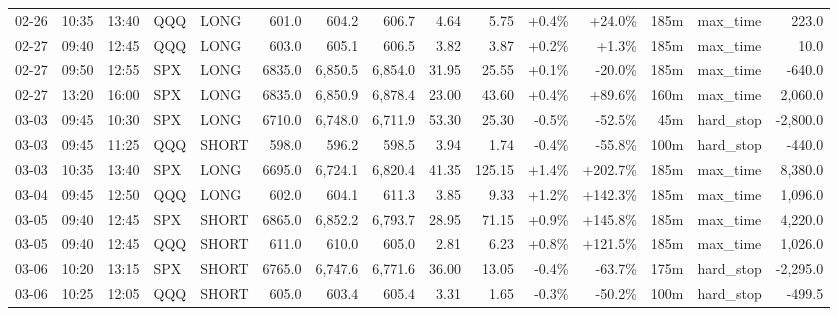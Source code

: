 \documentclass[11pt,a4paper,twoside]{article}
\begin{document}
\begin{landscape}
\begin{center}
\begin{longtable}{>{\color{txtmain}}l l l l l r r r r r r r r >{\color{txtmain}}l r}
02-26 & 10:35 & 13:40 & QQQ & LONG & 601.0 & 604.2 & 606.7 & 4.64 & 5.75 & \textcolor{wingreen}{+0.4\%} & \textcolor{wingreen}{+24.0\%} & 185m & max\_time & \textcolor{wingreen}{223.0} \\
02-27 & 09:40 & 12:45 & QQQ & LONG & 603.0 & 605.1 & 606.5 & 3.82 & 3.87 & \textcolor{wingreen}{+0.2\%} & \textcolor{wingreen}{+1.3\%} & 185m & max\_time & \textcolor{wingreen}{10.0} \\
02-27 & 09:50 & 12:55 & SPX & LONG & 6835.0 & 6,850.5 & 6,854.0 & 31.95 & 25.55 & \textcolor{wingreen}{+0.1\%} & \textcolor{lossred}{-20.0\%} & 185m & max\_time & \textcolor{lossred}{-640.0} \\
02-27 & 13:20 & 16:00 & SPX & LONG & 6835.0 & 6,850.9 & 6,878.4 & 23.00 & 43.60 & \textcolor{wingreen}{+0.4\%} & \textcolor{wingreen}{+89.6\%} & 160m & max\_time & \textcolor{wingreen}{2,060.0} \\
03-03 & 09:45 & 10:30 & SPX & LONG & 6710.0 & 6,748.0 & 6,711.9 & 53.30 & 25.30 & \textcolor{lossred}{-0.5\%} & \textcolor{lossred}{-52.5\%} & 45m & hard\_stop & \textcolor{lossred}{-2,800.0} \\
03-03 & 09:45 & 11:25 & QQQ & SHORT & 598.0 & 596.2 & 598.5 & 3.94 & 1.74 & \textcolor{lossred}{-0.4\%} & \textcolor{lossred}{-55.8\%} & 100m & hard\_stop & \textcolor{lossred}{-440.0} \\
03-03 & 10:35 & 13:40 & SPX & LONG & 6695.0 & 6,724.1 & 6,820.4 & 41.35 & 125.15 & \textcolor{wingreen}{+1.4\%} & \textcolor{wingreen}{+202.7\%} & 185m & max\_time & \textcolor{wingreen}{8,380.0} \\
03-04 & 09:45 & 12:50 & QQQ & LONG & 602.0 & 604.1 & 611.3 & 3.85 & 9.33 & \textcolor{wingreen}{+1.2\%} & \textcolor{wingreen}{+142.3\%} & 185m & max\_time & \textcolor{wingreen}{1,096.0} \\
03-05 & 09:40 & 12:45 & SPX & SHORT & 6865.0 & 6,852.2 & 6,793.7 & 28.95 & 71.15 & \textcolor{wingreen}{+0.9\%} & \textcolor{wingreen}{+145.8\%} & 185m & max\_time & \textcolor{wingreen}{4,220.0} \\
03-05 & 09:40 & 12:45 & QQQ & SHORT & 611.0 & 610.0 & 605.0 & 2.81 & 6.23 & \textcolor{wingreen}{+0.8\%} & \textcolor{wingreen}{+121.5\%} & 185m & max\_time & \textcolor{wingreen}{1,026.0} \\
03-06 & 10:20 & 13:15 & SPX & SHORT & 6765.0 & 6,747.6 & 6,771.6 & 36.00 & 13.05 & \textcolor{lossred}{-0.4\%} & \textcolor{lossred}{-63.7\%} & 175m & hard\_stop & \textcolor{lossred}{-2,295.0} \\
03-06 & 10:25 & 12:05 & QQQ & SHORT & 605.0 & 603.4 & 605.4 & 3.31 & 1.65 & \textcolor{lossred}{-0.3\%} & \textcolor{lossred}{-50.2\%} & 100m & hard\_stop & \textcolor{lossred}{-499.5} \\

\end{longtable}
\end{center}
\end{landscape}
\end{document}
